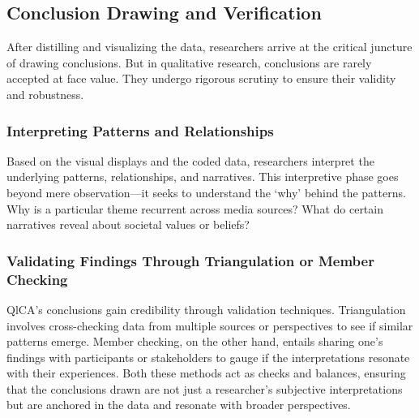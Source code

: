 \documentclass[
  b5paper]{book}
\begin{document}
\hypertarget{conclusion-drawing-and-verification}{%
\subsection*{Conclusion Drawing and Verification}\label{conclusion-drawing-and-verification}}

After distilling and visualizing the data, researchers arrive at the critical juncture of drawing conclusions. But in qualitative research, conclusions are rarely accepted at face value. They undergo rigorous scrutiny to ensure their validity and robustness.

\hypertarget{interpreting-patterns-and-relationships}{%
\subsubsection*{Interpreting Patterns and Relationships}\label{interpreting-patterns-and-relationships}}

Based on the visual displays and the coded data, researchers interpret the underlying patterns, relationships, and narratives. This interpretive phase goes beyond mere observation---it seeks to understand the `why' behind the patterns. Why is a particular theme recurrent across media sources? What do certain narratives reveal about societal values or beliefs?

\hypertarget{validating-findings-through-triangulation-or-member-checking}{%
\subsubsection*{Validating Findings Through Triangulation or Member Checking}\label{validating-findings-through-triangulation-or-member-checking}}

QlCA's conclusions gain credibility through validation techniques. Triangulation involves cross-checking data from multiple sources or perspectives to see if similar patterns emerge. Member checking, on the other hand, entails sharing one's findings with participants or stakeholders to gauge if the interpretations resonate with their experiences. Both these methods act as checks and balances, ensuring that the conclusions drawn are not just a researcher's subjective interpretations but are anchored in the data and resonate with broader perspectives.
\end{document}
